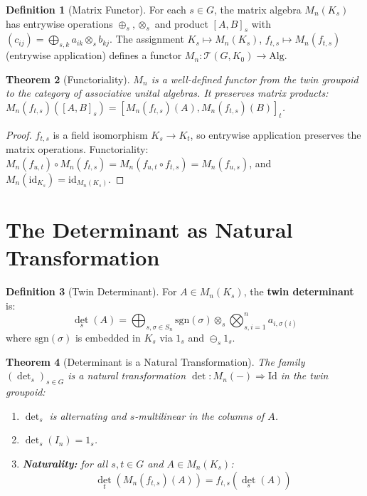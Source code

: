 \documentclass[11pt,twocolumn]{article}
\theoremstyle{plain}
\newtheorem{theorem}{Theorem}
\theoremstyle{definition}
\newtheorem{definition}[theorem]{Definition}
\theoremstyle{remark}
\begin{document}
\begin{definition}[Matrix Functor]\label{def:matrix-functor}
For each $s \in G$, the matrix algebra $M_n(K_s)$ has entrywise operations $\oplus_s, \otimes_s$ and product $[A, B]_s$ with $(c_{ij}) = \bigoplus_{s,k} a_{ik} \otimes_s b_{kj}$. The assignment $K_s \mapsto M_n(K_s)$, $f_{t,s} \mapsto M_n(f_{t,s})$ (entrywise application) defines a functor $M_n: \mathcal{T}(G, K_0) \to \mathrm{Alg}$.
\end{definition}

\begin{theorem}[Functoriality]\label{thm:functor}
$M_n$ is a well-defined functor from the twin groupoid to the category of associative unital algebras. It preserves matrix products: $M_n(f_{t,s})([A, B]_s) = [M_n(f_{t,s})(A), M_n(f_{t,s})(B)]_t$.
\end{theorem}

\begin{proof}
$f_{t,s}$ is a field isomorphism $K_s \to K_t$, so entrywise application preserves the matrix operations. Functoriality: $M_n(f_{u,t}) \circ M_n(f_{t,s}) = M_n(f_{u,t} \circ f_{t,s}) = M_n(f_{u,s})$, and $M_n(\mathrm{id}_{K_s}) = \mathrm{id}_{M_n(K_s)}$.
\end{proof}


\section{The Determinant as Natural Transformation}
\label{sec:det}

\begin{definition}[Twin Determinant]\label{def:det}
For $A \in M_n(K_s)$, the \textbf{twin determinant} is:
\begin{equation}
\det_s(A) = \bigoplus_{s,\sigma \in S_n} \mathrm{sgn}(\sigma) \otimes_s \bigotimes_{s,i=1}^n a_{i,\sigma(i)}
\end{equation}
where $\mathrm{sgn}(\sigma)$ is embedded in $K_s$ via $1_s$ and $\ominus_s 1_s$.
\end{definition}

\begin{theorem}[Determinant is a Natural Transformation]\label{thm:det-natural}
The family $(\det_s)_{s \in G}$ is a natural transformation $\det: M_n(-) \Rightarrow \mathrm{Id}$ in the twin groupoid:
\begin{enumerate}[label=(\alph*)]
    \item $\det_s$ is alternating and $s$-multilinear in the columns of $A$.
    \item $\det_s(I_n) = 1_s$.
    \item \textbf{Naturality:} for all $s, t \in G$ and $A \in M_n(K_s)$:
    \begin{equation}\label{eq:naturality}
    \boxed{\det_t(M_n(f_{t,s})(A)) = f_{t,s}(\det_s(A))}
    \end{equation}
\end{enumerate}
\end{theorem}
\end{document}
